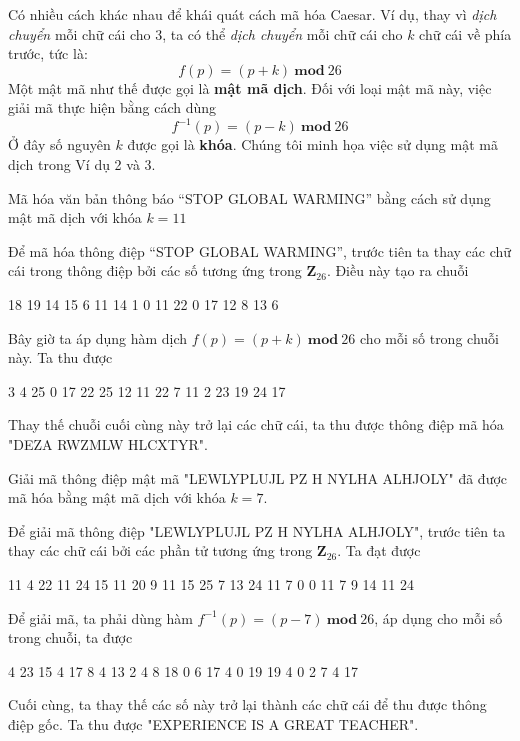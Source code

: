 Có nhiều cách khác nhau để khái quát cách mã hóa Caesar. Ví dụ, thay vì \textit{dịch chuyển} mỗi chữ cái cho 3, ta có thể \textit{dịch chuyển} mỗi chữ cái cho $k$ chữ cái về phía trước, tức là:
$$f(p) = (p+k)\ \mathbf{mod}\ 26$$
Một mật mã như thế được gọi là \textbf{mật mã dịch}. Đối với loại mật mã này, việc giải mã thực hiện bằng cách dùng
$$f^{-1}(p) = (p-k)\ \mathbf{mod}\ 26$$
Ở đây số nguyên $k$ được gọi là \textbf{khóa}. Chúng tôi minh họa việc sử dụng mật mã dịch trong Ví dụ 2 và 3.
\begin{example}
    Mã hóa văn bản thông báo “STOP GLOBAL WARMING” bằng cách sử dụng mật mã dịch với khóa $k = 11$
\end{example}
\begin{solution}
    Để mã hóa thông điệp “STOP GLOBAL WARMING”, trước tiên ta thay các chữ cái trong thông điệp bởi các số tương ứng trong $ \mathbf{Z}_{26} $. Điều này tạo ra chuỗi
    \begin{center}
        18 19 14 15 \hspace{0.5cm} 6 11 14 1 0 11 \hspace{0.5cm} 22 0 17 12 8 13 6
    \end{center}
    Bây giờ ta áp dụng hàm dịch $f(p) = (p+k)\ \mathbf{mod}\ 26$ cho mỗi số trong chuỗi này. Ta thu được
    \begin{center}
        3 4 25 0 \hspace{0.5cm} 17 22 25 12 11 22 \hspace{0.5cm} 7 11 2 23 19 24 17
    \end{center}
    Thay thế chuỗi cuối cùng này trở lại các chữ cái, ta thu được thông điệp mã hóa "DEZA RWZMLW HLCXTYR".
\end{solution}
\begin{example}
    Giải mã thông điệp mật mã "LEWLYPLUJL PZ H NYLHA ALHJOLY" đã được mã hóa bằng mật mã dịch với khóa $k = 7$.
\end{example}
\begin{solution}
    Để giải mã thông điệp "LEWLYPLUJL PZ H NYLHA ALHJOLY", trước tiên ta thay các chữ cái bởi các phần tử tương ứng trong $ \mathbf{Z}_{26} $. Ta đạt được
    \begin{center}
        11 4 22 11 24 15 11 20 9 11 \hspace{0.5cm} 15 25 \hspace{0.5cm} 7 \hspace{0.5cm} 13 24 11 7 0 \hspace{0.5cm} 0 11 7 9 14 11 24
    \end{center}
    Để giải mã, ta phải dùng hàm $f^{-1}(p) = (p-7)\ \mathbf{mod}\ 26$, áp dụng cho mỗi số trong chuỗi, ta được
    \begin{center}
        4 23 15 4 17 8 4 13 2 4 \hspace{0.5cm} 8 18 \hspace{0.5cm} 0 \hspace{0.5cm} 6 17 4 0 19 \hspace{0.5cm}  19 4 0 2 7 4 17
    \end{center}
    Cuối cùng, ta thay thế các số này trở lại thành các chữ cái để thu được thông điệp gốc. Ta thu được "EXPERIENCE IS A GREAT TEACHER".
\end{solution}

